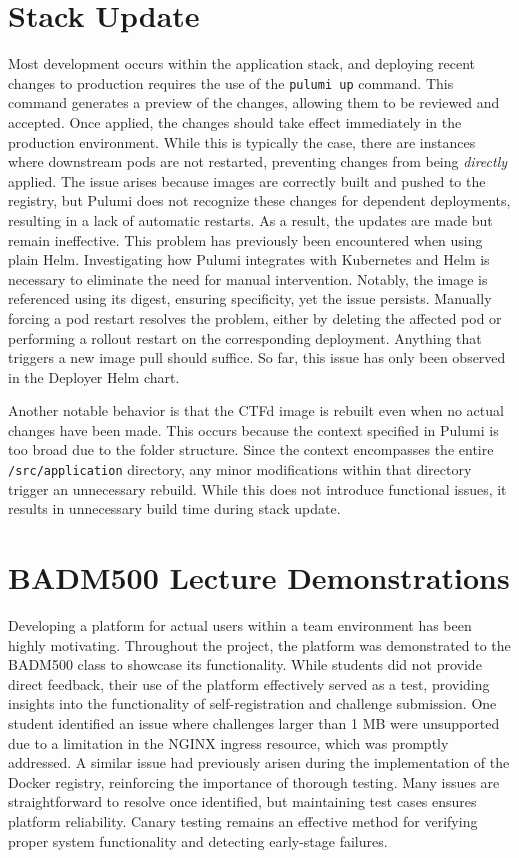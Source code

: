 \section{Stack Update}
Most development occurs within the application stack, and deploying recent changes to production requires the use of the \texttt{pulumi up} command. This command generates a preview of the changes, allowing them to be reviewed and accepted. Once applied, the changes should take effect immediately in the production environment. While this is typically the case, there are instances where downstream pods are not restarted, preventing changes from being \textit{directly} applied. The issue arises because images are correctly built and pushed to the registry, but Pulumi does not recognize these changes for dependent deployments, resulting in a lack of automatic restarts. As a result, the updates are made but remain ineffective. This problem has previously been encountered when using plain Helm. Investigating how Pulumi integrates with Kubernetes and Helm is necessary to eliminate the need for manual intervention. Notably, the image is referenced using its digest, ensuring specificity, yet the issue persists. Manually forcing a pod restart resolves the problem, either by deleting the affected pod or performing a rollout restart on the corresponding deployment. Anything that triggers a new image pull should suffice. So far, this issue has only been observed in the Deployer Helm chart.

Another notable behavior is that the CTFd image is rebuilt even when no actual changes have been made. This occurs because the context specified in Pulumi is too broad due to the folder structure. Since the context encompasses the entire \texttt{/src/application} directory, any minor modifications within that directory trigger an unnecessary rebuild. While this does not introduce functional issues, it results in unnecessary build time during stack update.

\section{BADM500 Lecture Demonstrations}
Developing a platform for actual users within a team environment has been highly motivating. Throughout the project, the platform was demonstrated to the BADM500 class to showcase its functionality. While students did not provide direct feedback, their use of the platform effectively served as a test, providing insights into the functionality of self-registration and challenge submission. One student identified an issue where challenges larger than 1 MB were unsupported due to a limitation in the NGINX ingress resource, which was promptly addressed. A similar issue had previously arisen during the implementation of the Docker registry, reinforcing the importance of thorough testing. Many issues are straightforward to resolve once identified, but maintaining test cases ensures platform reliability. Canary testing remains an effective method for verifying proper system functionality and detecting early-stage failures.

